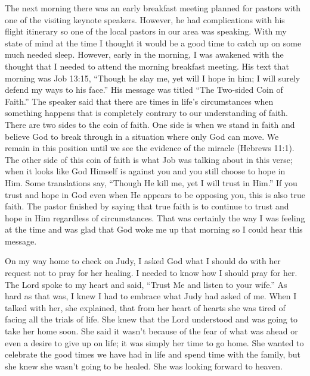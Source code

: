 \documentclass[oneside]{book}
\begin{document}
The next morning there was an early breakfast meeting planned for pastors with one of the visiting keynote speakers. However, he had complications with his flight itinerary so one of the local pastors in our area was speaking. With my state of mind at the time I thought it would be a good time to catch up on some much needed sleep. However, early in the morning, I was awakened with the thought that I needed to attend the morning breakfast meeting. His text that morning was Job 13:15, “Though he slay me, yet will I hope in him; I will surely defend my ways to his face.” His message was titled “The Two-sided Coin of Faith.” The speaker said that there are times in life’s circumstances when something happens that is completely contrary to our understanding of faith. There are two sides to the coin of faith. One side is when we stand in faith and believe God to break through in a situation where only God can move. We remain in this position until we see the evidence of the miracle (Hebrews 11:1). The other side of this coin of faith is what Job was talking about in this verse; when it looks like God Himself is against you and you still choose to hope in Him. Some translations say, “Though He kill me, yet I will trust in Him.” If you trust and hope in God even when He appears to be opposing you, this is also true faith. The pastor finished by saying that true faith is to continue to trust and hope in Him regardless of circumstances. That was certainly the way I was feeling at the time and was glad that God woke me up that morning so I could hear this message.

On my way home to check on Judy, I asked God what I should do with her request not to pray for her healing. I needed to know how I should pray for her. The Lord spoke to my heart and said, “Trust Me and listen to your wife.” As hard as that was, I knew I had to embrace what Judy had asked of me. When I talked with her, she explained, that from her heart of hearts she was tired of facing all the trials of life. She knew that the Lord understood and was going to take her home soon. She said it wasn’t because of the fear of what was ahead or even a desire to give up on life; it was simply her time to go home. She wanted to celebrate the good times we have had in life and spend time with the family, but she knew she wasn’t going to be healed. She was looking forward to heaven. 
\end{document}
